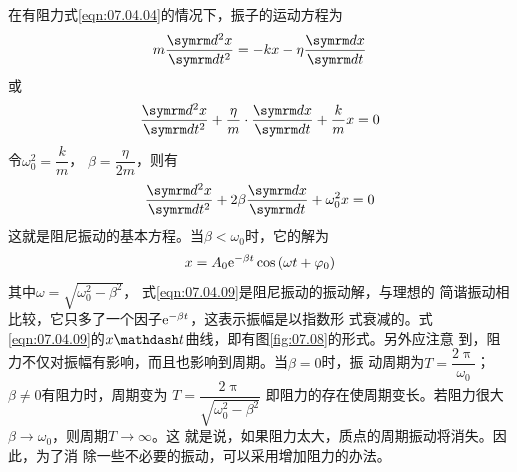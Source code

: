 在有阻力\lhbrak 式\eqref{eqn:07.04.04}\rhbrak 的情况下，振子的运动方程为
\begin{equation*}
  m \frac { \dif ^ { 2 } x } { \dif t ^ { 2 } } = - k x - \eta \frac { \dif x } { \dif t }
\end{equation*}
或
\begin{equation*}
  \frac { \dif ^ { 2 } x } { \dif t ^ { 2 } } + \frac { \eta } { m } \cdot \frac { \dif x } { \dif t } + \frac { k } { m } x = 0
\end{equation*}
令$ \omega _ 0 ^ { 2 } = \dfrac { k } { m } $， $ \beta = \dfrac { \eta } { 2 m } $，则有
\begin{equation}\label{eqn:07.04.08}
  \frac { \dif ^ { 2 } x } { \dif t ^ { 2 } } + 2 \beta \frac { \dif x } { \dif t } + \omega _ { 0 } ^ { 2 } x = 0
\end{equation}
这就是阻尼振动的基本方程。当$ \beta < \omega _ { 0 } $时，它的解为
\begin{equation}\label{eqn:07.04.09}
  x = A _ { 0 } \mathrm e ^ { - \beta t } \cos \left( \omega t + \varphi _ { 0 } \right)
\end{equation}
其中$\omega = \sqrt { \omega _ 0 ^ { 2 } - \beta ^ { 2 } } $， 式\eqref{eqn:07.04.09}是阻尼振动的振动解，与理想的
简谐振动相比较，它只多了一个因子$ \mathrm e ^ { - \beta t } $，这表示振幅是以指数形
式衰减的。式\eqref{eqn:07.04.09}的$ x \mathdash t $曲线，即有图\ref{fig:07.08}的形式。另外应注意
到，阻力不仅对振幅有影响，而且也影响到周期。当$ \beta = 0 $时，振
动周期为$ T = \dfrac { 2 \uppi } { \omega _ { 0 } } $；$ \beta \ne 0 $有阻力时，周期变为
$ T = \dfrac { 2 \uppi } { \sqrt { \omega _ { 0 } ^ { 2 } - \beta ^ { 2 } } } $
即阻力的存在使周期变长。若阻力很大$ \beta \to \omega _ { 0 } $，则周期$ T \to \infty $。这
就是说，如果阻力太大，质点的周期振动将消失。因此，为了消
除一些不必要的振动，可以采用增加阻力的办法。
